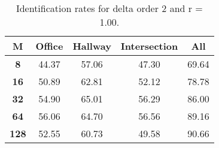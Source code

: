 \begin{table}[h]
    \small
    \centering
    \begin{tabular}{|c|c|c|c|l|}    
    \hline
    {\bf M} & {\bf Office} & {\bf Hallway} & {\bf Intersection} &     \multicolumn{1}{c|}{{\bf All}} \\ \hline
    {\bf 8} & 44.37 & 57.06 & 47.30 & 69.64 \\ \hline
    {\bf 16} & 50.89 & 62.81 & 52.12 & 78.78 \\ \hline
    {\bf 32} & 54.90 & 65.01 & 56.29 & 86.00 \\ \hline
    {\bf 64} & 56.06 & 64.70 & 56.56 & 89.16 \\ \hline
    {\bf 128} & 52.55 & 60.73 & 49.58 & 90.66 \\ \hline
    \end{tabular}
    \caption{Identification rates for delta order 2 and r = 1.00.}    
    \label{tab:identify_speakers_1.00_mit_19_2}
\end{table}
